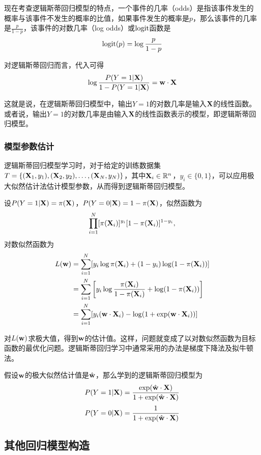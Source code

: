 现在考查逻辑斯蒂回归模型的特点，一个事件的几率（odds）是指该事件发生的概率与该事件不发生的概率的比值，如果事件发生的概率是$p$，那么该事件的几率是$\tfrac{p}{1-p}$，该事件的对数几率（log odds）或$\mathrm{logit}$函数是
\[
    \mathrm{logit}(p) = \log\frac{p}{1-p}
\]

对逻辑斯蒂回归而言，代入可得
\[
    \log\frac{P(Y=1|\mathbf{X})}{1-P(Y=1|\mathbf{X})} = \mathbf{w}\cdot\mathbf{X}
\]

这就是说，在逻辑斯蒂回归模型中，输出$Y=1$的对数几率是输入$\mathbf{X}$的线性函数。或者说，输出$Y=1$的对数几率是由输入$\mathbf{X}$的线性函数表示的模型，即逻辑斯蒂回归模型。

\subsubsection{模型参数估计}
逻辑斯蒂回归模型学习时，对于给定的训练数据集$T=\{(\mathbf{X}_1,y_1),(\mathbf{X}_2,y_2),\ldots,(\mathbf{X}_N,y_N)\}$，其中$\mathbf{X}_i\in\mathbb{R}^n$，$y_i\in\{0,1\}$，可以应用极大似然估计法估计模型参数，从而得到逻辑斯蒂回归模型。

设$P(Y=1|\mathbf{X})=\pi(\mathbf{X})$，$P(Y=0|\mathbf{X})=1-\pi(\mathbf{X})$，似然函数为
\[
    \prod_{i=1}^N[\pi(\mathbf{X}_i)]^{y_i}[1-\pi(\mathbf{X}_i)]^{1-y_i},
\]
对数似然函数为
\[
    \begin{aligned}
        L(\mathbf{w}) &= \sum_{i=1}^N[y_i\log\pi(\mathbf{X}_i)+(1-y_i)\log(1-\pi(\mathbf{X}_i))] \\
                 &= \sum_{i=1}^N\left[y_i\log\frac{\pi(\mathbf{X}_i)}{1-\pi(\mathbf{X}_i)}+\log(1-\pi(\mathbf{X}_i))\right] \\
                 &= \sum_{i=1}^N[y_i(\mathbf{w}\cdot\mathbf{X}_i)-\log(1+\exp(\mathbf{w}\cdot\mathbf{X}_i))]
    \end{aligned}
\]

对$L(\mathbf{w})$求极大值，得到$\mathbf{w}$的估计值。这样，问题就变成了以对数似然函数为目标函数的最优化问题。逻辑斯蒂回归学习中通常采用的办法是梯度下降法及拟牛顿法。

假设$\mathbf{w}$的极大似然估计值是$\hat{\mathbf{w}}$，那么学到的逻辑斯蒂回归模型为
\[
    P(Y=1|\mathbf{X}) = \frac{\exp(\hat{\mathbf{w}}\cdot\mathbf{X})}{1+\exp(\hat{\mathbf{w}}\cdot\mathbf{X})}
\]
\[
    P(Y=0|\mathbf{X}) = \frac{1}{1+\exp(\hat{\mathbf{w}}\cdot\mathbf{X})}
\]


\subsection{其他回归模型构造}
